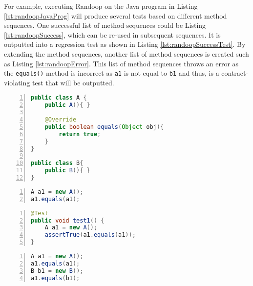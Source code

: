 For example, executing Randoop on the Java program in Listing \ref{lst:randoopJavaProg} will produce several tests based on different method sequences.
One successful list of method sequences could be Listing \ref{lst:randoopSuccess},  which can be re-used in subsequent sequences. It is outputted into a regression test as shown in Listing \ref{lst:randoopSuccessTest}.
By extending the method sequences, another list of method sequences is created such as Listing \ref{lst:randoopError}.
This list of method sequences throws an error as the \texttt{equals()} method is incorrect as \texttt{a1} is not equal to \texttt{b1} and thus, is a contract-violating test that will be outputted.

\begin{lstlisting}[language=Java, tabsize=3, numbers=left,
label={lst:randoopJavaProg}, caption={Example Java class}]
public class A {
	public A(){ }
		
	@Override
	public boolean equals(Object obj){
		return true;
	}
}

public class B{
	public B(){ }
}
\end{lstlisting}

\begin{lstlisting}[language=Java, tabsize=3, numbers=left,
label={lst:randoopSuccess}, caption={Successful method sequence for testing Listing \ref{lst:randoopJavaProg}}]
A a1 = new A();
a1.equals(a1);
\end{lstlisting}

\begin{lstlisting}[language=Java, tabsize=3, numbers=left,
label={lst:randoopSuccessTest}, caption={Test output for the successful method sequence in Listing \ref{lst:randoopSuccess}}]
@Test
public void test1() {
	A a1 = new A();
	assertTrue(a1.equals(a1));
}
\end{lstlisting}

\begin{lstlisting}[language=Java, tabsize=3, numbers=left,
label={lst:randoopError}, caption={Contract violating method sequence for testing Listing \ref{lst:randoopJavaProg}}]
A a1 = new A();
a1.equals(a1);
B b1 = new B();
a1.equals(b1);
\end{lstlisting}


